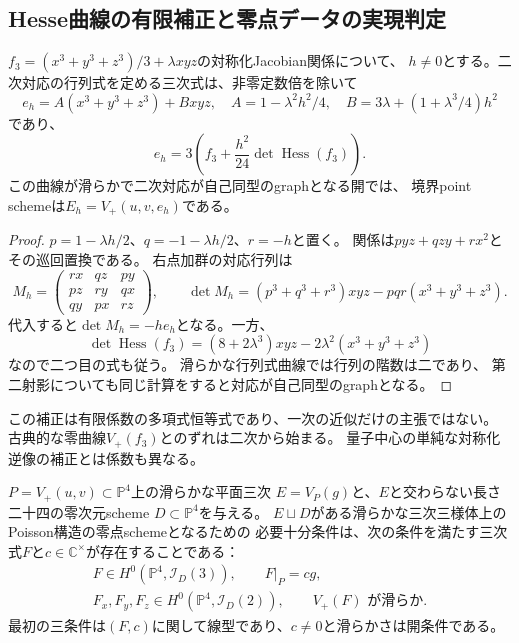 \subsection{Hesse曲線の有限補正と零点データの実現判定}
\begin{proposition}[境界点曲線のHessian補正]
\label{prop:point-hesse-hessian-correction}
$f_3=(x^3+y^3+z^3)/3+\lambda xyz$の対称化Jacobian関係について、
$h\ne0$とする。二次対応の行列式を定める三次式は、非零定数倍を除いて
\[
 e_h=A(x^3+y^3+z^3)+Bxyz,
 \quad A=1-\lambda^2h^2/4,
 \quad B=3\lambda+(1+\lambda^3/4)h^2
\]
であり、
\[
 e_h=3\left(f_3+\frac{h^2}{24}\det\operatorname{Hess}(f_3)\right).
\]
この曲線が滑らかで二次対応が自己同型のgraphとなる開では、
境界point schemeは$E_h=V_+(u,v,e_h)$である。
\end{proposition}
\begin{proof}
$p=1-\lambda h/2$、$q=-1-\lambda h/2$、$r=-h$と置く。
関係は$pyz+qzy+rx^2$とその巡回置換である。
右点加群の対応行列は
\[
 M_h=\begin{pmatrix}rx&qz&py\\pz&ry&qx\\qy&px&rz\end{pmatrix},
 \qquad \det M_h=(p^3+q^3+r^3)xyz-pqr(x^3+y^3+z^3).
\]
代入すると$\det M_h=-he_h$となる。一方、
\[
 \det\operatorname{Hess}(f_3)
 =(8+2\lambda^3)xyz-2\lambda^2(x^3+y^3+z^3)
\]
なので二つ目の式も従う。
滑らかな行列式曲線では行列の階数は二であり、
第二射影についても同じ計算をすると対応が自己同型のgraphとなる。
\end{proof}

この補正は有限係数の多項式恒等式であり、一次の近似だけの主張ではない。
古典的な零曲線$V_+(f_3)$とのずれは二次から始まる。
量子中心の単純な対称化逆像の補正とは係数も異なる。




\begin{proposition}[零点schemeの線型実現判定]
\label{prop:poisson-zero-linear-realization}
$P=V_+(u,v)\subset\mathbb P^4$上の滑らかな平面三次
$E=V_P(g)$と、$E$と交わらない長さ二十四の零次元scheme
$D\subset\mathbb P^4$を与える。
$E\sqcup D$がある滑らかな三次三様体上のPoisson構造の零点schemeとなるための
必要十分条件は、次の条件を満たす三次式$F$と$c\in\mathbb C^\times$が存在することである：
\[
 \begin{gathered}
 F\in H^0(\mathbb P^4,\mathcal I_D(3)),\qquad
 F|_P=cg,\\
 F_x,F_y,F_z\in H^0(\mathbb P^4,\mathcal I_D(2)),\qquad
 V_+(F)\text{ が滑らか}.
 \end{gathered}
\]
最初の三条件は$(F,c)$に関して線型であり、$c\ne0$と滑らかさは開条件である。
\end{proposition}


